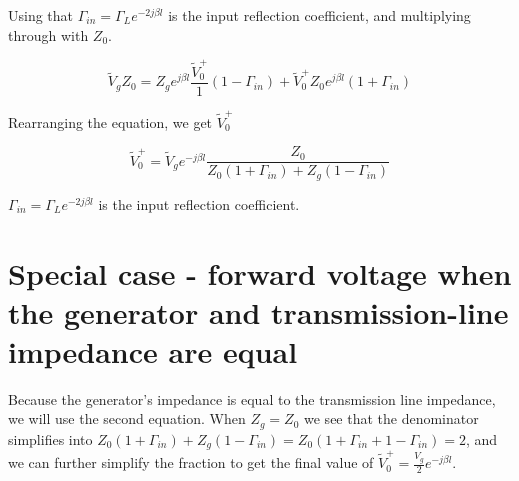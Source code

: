 \documentclass{ximera}
\begin{document}
Using that 
 $\Gamma_{in} = \Gamma_L e^{-2 j \beta l} $ is the input reflection coefficient, and multiplying through with $Z_0$.


\begin{equation}
\tilde{V}_g Z_0=Z_g e^{j \beta l} \frac{\tilde{V}_0^+}{1}  (1 - \Gamma_{in} ) + \tilde{V}_0^+ Z_0 e^{j \beta l} (1 + \Gamma_{in}) 
\end{equation}


Rearranging the equation, we get $\tilde{V}_0^+$

\begin{equation}
\tilde{V}_0^+=\tilde{V}_g e^{-j \beta l} \frac{Z_0}{Z_0 (1+\Gamma_{in}) +Z_g (1-\Gamma_{in})}
\end{equation}

 $\Gamma_{in} = \Gamma_L e^{-2 j \beta l} $ is the input reflection coefficient.



\section{Special case - forward voltage when the generator and transmission-line impedance are equal}

Because the generator's impedance is equal to the transmission line impedance, we will use the second equation. When $Z_g=Z_0$ we see that the denominator simplifies into $Z_0 (1+\Gamma_{in}) +Z_g (1-\Gamma_{in}) = Z_0 (1+\Gamma_{in}+1-\Gamma_{in})=2$, and we can further simplify the fraction to get the final value of $\tilde{V}_0^+=\frac{V_g}{2} e^{-j \beta l}$. 
\end{document}
